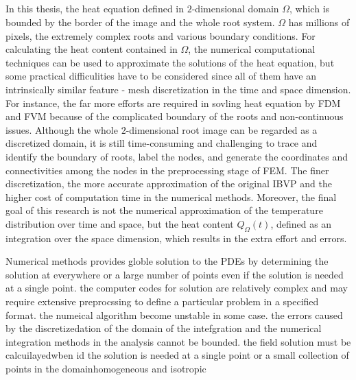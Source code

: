 \subsection{}



In this thesis, the heat equation defined in $2$-dimensional domain
$\Omega$, which is bounded by the border of the image and the whole
root system. $\Omega$ has millions of pixels, the extremely complex
roots and various boundary conditions. For calculating the heat
content contained in $\Omega$, the numerical computational techniques
can be used to approximate the solutions of the heat equation, but
some practical difficulities have to be considered since all of them
have an intrinsically similar feature - mesh discretization in the
time and space dimension. For instance, the far more efforts are
required in sovling heat equation by FDM and FVM because of the
complicated boundary of the roots and non-continuous issues. Although
the whole $2$-dimensional root image can be regarded as a discretized
domain, it is still time-consuming and challenging to trace and
identify the boundary of roots, label the nodes, and generate the
coordinates and connectivities among the nodes in the preprocessing
stage of FEM. The finer discretization, the more accurate
approximation of the original IBVP and the higher cost of computation
time in the numerical methods. Moreover, the final goal of this
research is not the numerical approximation of the temperature
distribution over time and space, but the heat content
$Q_{\Omega}(t)$, defined as an integration over the space dimension,
which results in the extra effort and errors.



Numerical methods provides globle solution to the PDEs by determining
the solution at everywhere or a large number of points even if the
solution is needed at a single point. the computer codes for solution
are relatively complex and may require extensive preprocssing to
define a particular problem in a specified format. the numeical
algorithm become unstable in some case. the errors caused by the
discretizedation of the domain of the intefgration and the numerical
integration methods in the analysis cannot be bounded. the field
solution must be calcuilayedwben id the solution is needed at a single
point or a small collection of points in the domainhomogeneous and
isotropic
